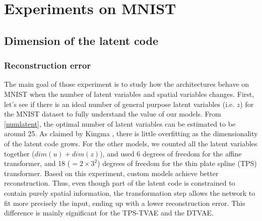 \documentclass[letterpaper, twoside]{article}
\begin{document}
\section{Experiments on MNIST}
\subsection{Dimension of the latent code}
\subsubsection{Reconstruction error}

The main goal of those experiment is to study how the architectures behave on MNIST when the number of latent variables and spatial variables changes. First, let's see if there is an ideal number of general purpose latent variables (i.e. $z$) for the MNIST dataset to fully understand the value of our models. From \ref{numlatent}, the optimal number of latent variables can be estimated to be around 25. As claimed by Kingma \cite{Kingma.aevb}, there is little overfitting as the dimensionality of the latent code grows. For the other models, we counted all the latent variables together ($dim(u) + dim(z)$), and used 6 degrees of freedom for the affine transformer, and 18 ($=2\times 3^2$) degrees of freedom for the thin plate spline (TPS) transformer. Based on this experiment, custom models achieve better reconstruction. Thus, even though part of the latent code is constrained to contain purely spatial information, the transformation step allows the network to fit more precisely the input, ending up with a lower reconstruction error. This difference is mainly significant for the TPS-TVAE and the DTVAE.\\
\end{document}
